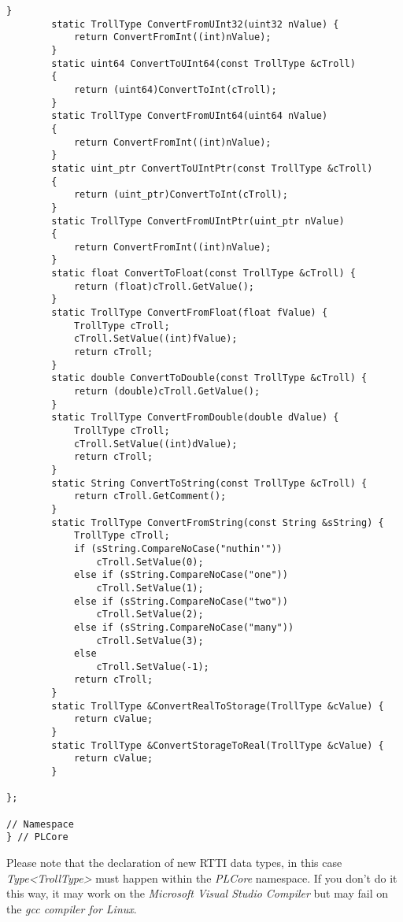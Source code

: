 \begin{lstlisting}[label=Code:UserDefinedRTTIDataTypeInline,caption={Inline of the user defined RTTI data type}]
		}
		static TrollType ConvertFromUInt32(uint32 nValue) {
			return ConvertFromInt((int)nValue);
		}
		static uint64 ConvertToUInt64(const TrollType &cTroll)
		{
			return (uint64)ConvertToInt(cTroll);
		}
		static TrollType ConvertFromUInt64(uint64 nValue)
		{
			return ConvertFromInt((int)nValue);
		}
		static uint_ptr ConvertToUIntPtr(const TrollType &cTroll)
		{
			return (uint_ptr)ConvertToInt(cTroll);
		}
		static TrollType ConvertFromUIntPtr(uint_ptr nValue)
		{
			return ConvertFromInt((int)nValue);
		}
		static float ConvertToFloat(const TrollType &cTroll) {
			return (float)cTroll.GetValue();
		}
		static TrollType ConvertFromFloat(float fValue) {
			TrollType cTroll;
			cTroll.SetValue((int)fValue);
			return cTroll;
		}
		static double ConvertToDouble(const TrollType &cTroll) {
			return (double)cTroll.GetValue();
		}
		static TrollType ConvertFromDouble(double dValue) {
			TrollType cTroll;
			cTroll.SetValue((int)dValue);
			return cTroll;
		}
		static String ConvertToString(const TrollType &cTroll) {
			return cTroll.GetComment();
		}
		static TrollType ConvertFromString(const String &sString) {
			TrollType cTroll;
			if (sString.CompareNoCase("nuthin'"))
				cTroll.SetValue(0);
			else if (sString.CompareNoCase("one"))
				cTroll.SetValue(1);
			else if (sString.CompareNoCase("two"))
				cTroll.SetValue(2);
			else if (sString.CompareNoCase("many"))
				cTroll.SetValue(3);
			else
				cTroll.SetValue(-1);
			return cTroll;
		}
		static TrollType &ConvertRealToStorage(TrollType &cValue) {
			return cValue;
		}
		static TrollType &ConvertStorageToReal(TrollType &cValue) {
			return cValue;
		}

};

// Namespace
} // PLCore
\end{lstlisting}
Please note that the declaration of new RTTI data types, in this case \emph{Type<TrollType>} must happen within the \emph{PLCore} namespace. If you don't do it this way, it may work on the \emph{Microsoft Visual Studio Compiler} but may fail on the \emph{gcc compiler for Linux}.


